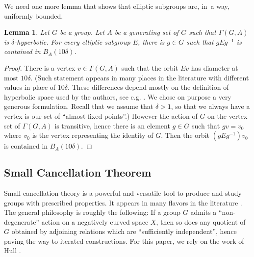 \documentclass[11pt]{article}
\newtheorem{lemma}[theorem]{Lemma}
\theoremstyle{definition}
\begin{document}
We need one more lemma that shows that elliptic subgroups are, in~a way, uniformly bounded.

\begin{lemma}
\label{lem:elliptic}
Let $G$ be a group.
Let $A$ be a generating set of $G$ such that $\Gamma(G,A)$ is $\delta$-hyperbolic.
For every elliptic subgroup $E$, there is $g \in G$ such that $gEg^{-1}$ is contained in $B_A(10\delta)$.
\end{lemma}

\begin{proof}
There is a vertex $v \in \Gamma(G, A)$ such that the orbit $Ev$ has diameter at most $10\delta$. (Such statement appears in many places in the literature with different values in place of $10\delta$. These differences depend mostly on the definition of hyperbolic space used by the authors, see e.g. \cite[III.$\Gamma$, Lem.\,3.3]{BH}. We chose on purpose a very generous formulation. Recall that we assume that $\delta > 1$, so that we always have a vertex is our set of ``almost fixed points''.)
However the action of $G$ on the vertex set of $\Gamma(G,A)$ is transitive, hence there is an element $g \in G$ such that $gv = v_0$ where $v_0$ is the vertex representing the identity of $G$.
Then the orbit $(g E g^{-1}) v_0$ is contained in $B_A(10 \delta)$.
\end{proof}

\subsection{Small Cancellation Theorem}

Small cancellation theory is a powerful and versatile tool to produce and study groups with prescribed properties.
It appears in many flavors in the literature \cite{Lyndon:2001wm,Olshanskii:1991wv, Gromov:2001us, Osin:2010dx, Coulon:2014fr,DGO}.
The general philosophy is roughly the following: If a group $G$ admits a ``non-degenerate'' action on a negatively curved space $X$, then so does any quotient of $G$ obtained by adjoining relations which are ``sufficiently independent'', hence paving the way to iterated constructions.
For this paper, we rely on the work of Hull \cite{hull}.
\end{document}
